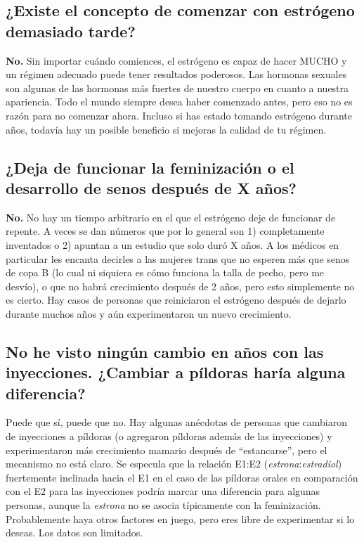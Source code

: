 \documentclass{article}
\begin{document}
\subsection{¿Existe el concepto de comenzar con estrógeno demasiado tarde?}\label{11-5}

\textbf{No.} Sin importar cuándo comiences, el estrógeno es capaz de hacer MUCHO y un régimen adecuado puede tener resultados poderosos. Las hormonas sexuales son algunas de las hormonas más fuertes de nuestro cuerpo en cuanto a nuestra apariencia. Todo el mundo siempre desea haber comenzado antes, pero eso no es razón para no comenzar ahora. Incluso si has estado tomando estrógeno durante años, todavía hay un posible beneficio si mejoras la calidad de tu régimen.

\subsection{¿Deja de funcionar la feminización o el desarrollo de senos después de X años?}\label{11-6}

\textbf{No.} No hay un tiempo arbitrario en el que el estrógeno deje de funcionar de repente. A veces se dan números que por lo general son 1) completamente inventados o 2) apuntan a un estudio que solo duró X años. A los médicos en particular les encanta decirles a las mujeres trans que no esperen más que senos de copa B (lo cual ni siquiera es cómo funciona la talla de pecho, pero me desvío), o que no habrá crecimiento después de 2 años, pero esto simplemente no es cierto. Hay casos de personas que reiniciaron el estrógeno después de dejarlo durante muchos años y aún experimentaron un nuevo crecimiento.

\subsection{No he visto ningún cambio en años con las inyecciones. ¿Cambiar a píldoras haría alguna diferencia?}

Puede que sí, puede que no. Hay algunas anécdotas de personas que cambiaron de inyecciones a píldoras (o agregaron píldoras además de las inyecciones) y experimentaron más crecimiento mamario después de “estancarse”, pero el mecanismo no está claro. Se especula que la relación E1:E2 (\textit{estrona}:\textit{estradiol}) fuertemente inclinada hacia el E1 en el caso de las píldoras orales en comparación con el E2 para las inyecciones podría marcar una diferencia para algunas personas, aunque la \textit{estrona} no se asocia típicamente con la feminización. Probablemente haya otros factores en juego, pero eres libre de experimentar si lo deseas. Los datos son limitados.
\end{document}

